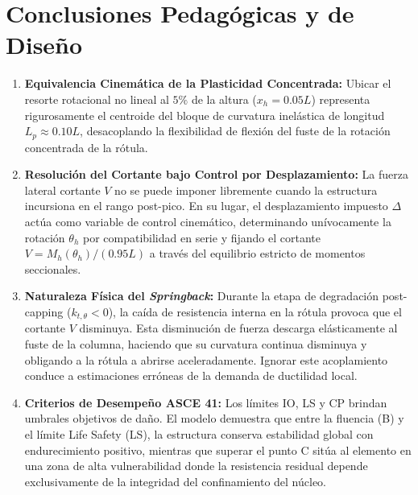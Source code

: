 \documentclass[11pt,letterpaper]{article}
\begin{document}
\section{Conclusiones Pedagógicas y de Diseño}

\begin{enumerate}
    \item \textbf{Equivalencia Cinemática de la Plasticidad Concentrada:} Ubicar el resorte rotacional no lineal al $5\%$ de la altura ($x_h = 0.05 L$) representa rigurosamente el centroide del bloque de curvatura inelástica de longitud $L_p \approx 0.10 L$, desacoplando la flexibilidad de flexión del fuste de la rotación concentrada de la rótula.
    \item \textbf{Resolución del Cortante bajo Control por Desplazamiento:} La fuerza lateral cortante $V$ no se puede imponer libremente cuando la estructura incursiona en el rango post-pico. En su lugar, el desplazamiento impuesto $\Delta$ actúa como variable de control cinemático, determinando unívocamente la rotación $\theta_h$ por compatibilidad en serie y fijando el cortante $V = M_h(\theta_h) / (0.95 L)$ a través del equilibrio estricto de momentos seccionales.
    \item \textbf{Naturaleza Física del \textit{Springback}:} Durante la etapa de degradación post-capping ($k_{t,\theta} < 0$), la caída de resistencia interna en la rótula provoca que el cortante $V$ disminuya. Esta disminución de fuerza descarga elásticamente al fuste de la columna, haciendo que su curvatura continua disminuya y obligando a la rótula a abrirse aceleradamente. Ignorar este acoplamiento conduce a estimaciones erróneas de la demanda de ductilidad local.
    \item \textbf{Criterios de Desempeño ASCE 41:} Los límites IO, LS y CP brindan umbrales objetivos de daño. El modelo demuestra que entre la fluencia (B) y el límite Life Safety (LS), la estructura conserva estabilidad global con endurecimiento positivo, mientras que superar el punto C sitúa al elemento en una zona de alta vulnerabilidad donde la resistencia residual depende exclusivamente de la integridad del confinamiento del núcleo.
\end{enumerate}
\end{document}
